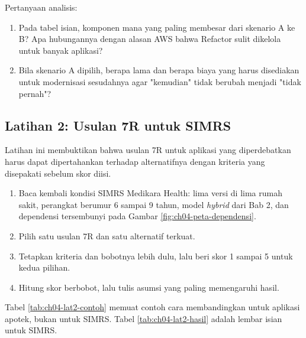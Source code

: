 Pertanyaan analisis:
\begin{enumerate}
  \item Pada tabel isian, komponen mana yang paling membesar dari skenario A ke B? Apa
        hubungannya dengan alasan AWS bahwa Refactor sulit dikelola untuk banyak aplikasi?
  \item Bila skenario A dipilih, berapa lama dan berapa biaya yang harus disediakan untuk
        modernisasi sesudahnya agar "kemudian" tidak berubah menjadi "tidak pernah"?
\end{enumerate}

\subsection*{Latihan 2: Usulan 7R untuk SIMRS}

Latihan ini membuktikan bahwa usulan 7R untuk aplikasi yang diperdebatkan harus dapat
dipertahankan terhadap alternatifnya dengan kriteria yang disepakati sebelum skor diisi.

\begin{enumerate}
  \item Baca kembali kondisi SIMRS Medikara Health: lima versi di lima rumah sakit,
        perangkat berumur 6 sampai 9 tahun, model \textit{hybrid} dari Bab 2, dan
        dependensi tersembunyi pada Gambar \ref{fig:ch04-peta-dependensi}.
  \item Pilih satu usulan 7R dan satu alternatif terkuat.
  \item Tetapkan kriteria dan bobotnya lebih dulu, lalu beri skor 1 sampai 5 untuk kedua
        pilihan.
  \item Hitung skor berbobot, lalu tulis asumsi yang paling memengaruhi hasil.
\end{enumerate}

Tabel \ref{tab:ch04-lat2-contoh} memuat contoh cara membandingkan untuk aplikasi apotek,
bukan untuk SIMRS. Tabel \ref{tab:ch04-lat2-hasil} adalah lembar isian untuk SIMRS.

